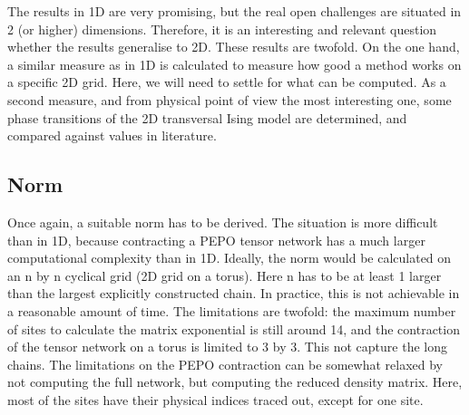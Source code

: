 The results in 1D are very promising, but the real open challenges are situated in 2 (or higher) dimensions. Therefore, it is an interesting and relevant question whether the results generalise to 2D. These results are twofold. On the one hand, a similar measure as in 1D is calculated to measure how good a method works on a specific 2D grid. Here, we will need to settle for what can be computed. As a second measure, and from physical point of view the most interesting one, some phase transitions of the 2D transversal Ising model are determined, and compared against values in literature.

\subsection{Norm}

Once again, a suitable norm has to be derived. The situation is more difficult than in 1D, because contracting a PEPO tensor network has a much larger computational complexity than in 1D. Ideally, the norm would be calculated on an n by n cyclical grid (2D grid on a torus). Here n has to be at least 1 larger than the largest explicitly constructed chain. In practice, this is not achievable in a reasonable amount of time. The limitations are twofold: the maximum number of sites to calculate the matrix exponential is still around 14, and the contraction of the tensor network on a torus is limited to 3 by 3. This not capture the long chains.  The limitations on the PEPO contraction can be somewhat relaxed by not computing the full network, but computing the reduced density matrix. Here, most of the sites have their physical indices traced out, except for one site.

